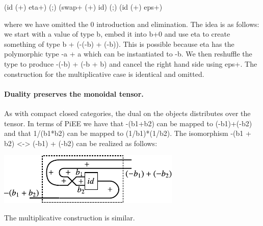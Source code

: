 \documentclass[preprint]{sigplanconf}
\begin{document}
{{ (id (+) eta+) (;) (swap+ (+) id) (;) (id (+) eps+) }}

\noindent where we have omitted the 0 introduction and elimination. The idea
is as follows: we start with a value of type {{b}}, embed it into {{b+0}} and
use {{eta}} to create something of type {{b + (-(-b) + (-b))}}. This is possible
because {{eta}} has the polymorphic type {{-a + a}} which can be instantiated
to {{-b}}. We then reshuffle the type to produce {{-(-b) + (-b + b)}} and cancel
the right hand side using {{eps+}}.  The construction for the multiplicative 
case is identical and omitted.


\paragraph*{Duality preserves the monoidal tensor. }
As with compact closed categories, the dual on the objects distributes
over the tensor. In terms of {{PiEE}} we have that {{-(b1+b2)}}
can be mapped to {{(-b1)+(-b2)}} and that {{1/(b1*b2)}} can be mapped
to {{(1/b1)*(1/b2)}}. The isomorphism {{-(b1 + b2) <-> (-b1) + (-b2)}}
can be realized as follows:
\begin{center}
  \includegraphics{diagrams/dist_neg_plus.pdf}
\end{center}

\noindent
The multiplicative construction is similar. 

\end{document}
